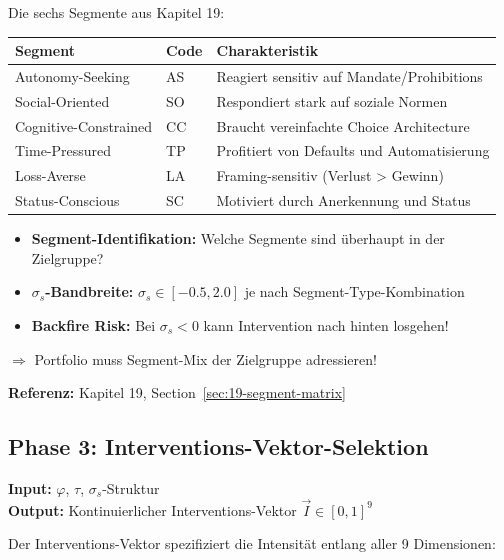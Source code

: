 Die sechs Segmente aus Kapitel 19:

\begin{center}
\renewcommand{\arraystretch}{1.2}
\begin{tabular}{@{}lll@{}}
\toprule
\textbf{Segment} & \textbf{Code} & \textbf{Charakteristik} \\
\midrule
Autonomy-Seeking & AS & Reagiert sensitiv auf Mandate/Prohibitions \\
Social-Oriented & SO & Respondiert stark auf soziale Normen \\
Cognitive-Constrained & CC & Braucht vereinfachte Choice Architecture \\
Time-Pressured & TP & Profitiert von Defaults und Automatisierung \\
Loss-Averse & LA & Framing-sensitiv (Verlust > Gewinn) \\
Status-Conscious & SC & Motiviert durch Anerkennung und Status \\
\bottomrule
\end{tabular}
\end{center}

\begin{tcolorbox}[colback=orange!5!white, colframe=orange!75!black,
    title=\textbf{Variabilität in Phase 2}]
\begin{itemize}[nosep]
\item \textbf{Segment-Identifikation:} Welche Segmente sind überhaupt in der Zielgruppe?
\item \textbf{$\sigma_s$-Bandbreite:} $\sigma_s \in [-0.5, 2.0]$ je nach Segment-Type-Kombination
\item \textbf{Backfire Risk:} Bei $\sigma_s < 0$ kann Intervention nach hinten losgehen!
\end{itemize}
$\Rightarrow$ Portfolio muss Segment-Mix der Zielgruppe adressieren!
\end{tcolorbox}

\textbf{Referenz:} Kapitel 19, Section~\ref{sec:19-segment-matrix}

\subsection{Phase 3: Interventions-Vektor-Selektion}
\label{sec:20-phase3}

\textbf{Input:} $\varphi$, $\tau$, $\sigma_s$-Struktur\\
\textbf{Output:} Kontinuierlicher Interventions-Vektor $\vec{I} \in [0,1]^9$

Der Interventions-Vektor spezifiziert die Intensität entlang aller 9 Dimensionen:

